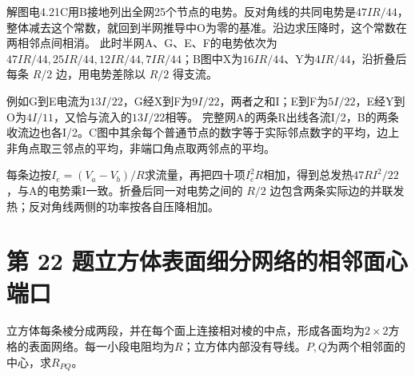 \documentclass[UTF8,fontset=fandol,a4paper,11pt]{ctexart}
\begin{document}
解图电4.21C用B接地列出全网25个节点的电势。反对角线的共同电势是$47IR/44$，整体减去这个常数，就回到半网推导中O为零的基准。沿边求压降时，这个常数在两相邻点间相消。
此时半网A、G、E、F的电势依次为$47IR/44,25IR/44,12IR/44,7IR/44$；B图中X为$16IR/44$、Y为$4IR/44$，沿折叠后每条 $R/2$ 边，用电势差除以 $R/2$ 得支流。

例如G到E电流为$13I/22$，G经X到F为$9I/22$，两者之和I；E到F为$5I/22$，E经Y到O为$4I/11$，又恰与流入的$13I/22$相等。
完整网A的两条R出线各流I/2，B的两条收流边也各I/2。C图中其余每个普通节点的数字等于实际邻点数字的平均，边上非角点取三邻点的平均，非端口角点取两邻点的平均。

每条边按$I_e=(V_a-V_b)/R$求流量，再把四十项$I_e^2R$相加，得到总发热$47RI^2/22$，与A的电势乘I一致。折叠后同一对电势之间的 $R/2$ 边包含两条实际边的并联发热；反对角线两侧的功率按各自压降相加。




\section*{第 22 题\quad 立方体表面细分网络的相邻面心端口}\label{q:22}

立方体每条棱分成两段，并在每个面上连接相对棱的中点，形成各面均为$2\times2$方格的表面网络。每一小段电阻均为$R$；立方体内部没有导线。$P,Q$为两个相邻面的中心，求$R_{PQ}$。
\end{document}
